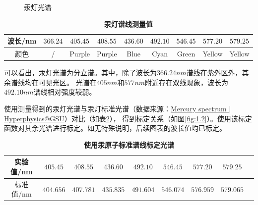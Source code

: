 \documentclass[12pt,a4paper,UTF8]{ctexart}
\begin{document}
\begin{figure}[htbp]
	\centering
	\caption{汞灯光谱}
\end{figure}

\begin{table}[htbp]
	\centering
	\begin{tabular}{ccccccccc}
	\toprule
	波长/nm &$366.24$ &$405.45$ &$408.55$ &$436.60$ &$492.10$ &$546.45$ &$577.20$ &$579.25$\\
	\midrule
	颜色 &/ &Purple &Purple &Blue &Cyan &Green &Yellow &Yellow \\
	\bottomrule
    \end{tabular}
	\caption{\textbf{汞灯谱线测量值}}
	\label{tab:1.1}
\end{table}
	
可以看出，汞灯光谱为分立谱。其中，除了波长为$366.24nm$谱线在紫外区外，其余谱线均在可见光区。
光谱在$405nm$和$577nm$附近存在双线现象，波长为$492.10nm$谱线相对强度较弱。

使用测量得到的汞灯光谱与汞灯标准光谱（数据来源：\href{http://hyperphysics.phy-astr.gsu.edu/hbase/quantum/atspect2.html#c2}{Mercury spectrum | Hyperphysics@GSU}）对比（如表\ref{tab:1.2}），
得到标定关系（如图\ref{fig:1.2}）。使用该标定函数对其余光谱进行标定。如无特殊说明，后续图表的波长值均已标定。
\begin{table}[htbp]
	\centering
	\begin{tabular}{ccccccccc}
	\toprule
	实验值/nm &$405.45$ &$408.55$ &$436.60$ &$492.10$ &$546.45$ &$577.20$ &$579.25$\\
	\midrule
	标准值/nm &$404.656$ &$407.781$ &$435.835$ &$491.604$ &$546.074$ &$576.959$ &$579.065$\\
	\bottomrule
    \end{tabular}
	\caption{\textbf{使用汞原子标准谱线标定光谱}}
	\label{tab:1.2}
\end{table}
\end{document}
